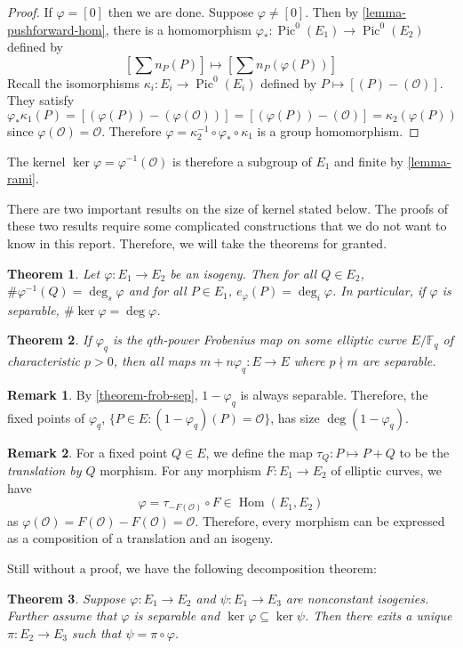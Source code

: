 \documentclass[12pt]{article}
\newtheorem{theorem}{Theorem}[subsection]
\theoremstyle{remark}
\theoremstyle{definition}
\newtheorem{remark}{Remark}[subsection]
\newcommand{\F}[0]{\mathbb{F}}
\newcommand{\ecO}[0]{\mathcal O}
\newcommand{\kp}[0]{\kappa}
\newcommand{\Hom}[0]{\operatorname{Hom}}
\newcommand{\Pic}[0]{\operatorname{Pic}}
\begin{document}
        \begin{proof}
            If $\varphi=[0]$ then we are done. Suppose $\varphi\neq[0]$. Then by \autoref{lemma-pushforward-hom}, there is a homomorphism $\varphi_*:\Pic^0(E_1)\to\Pic^0(E_2)$ defined by
            \[\left[\sum n_P(P)\right]\mapsto\left[\sum n_P(\varphi(P))\right]\]
            Recall the isomorphisms $\kp_i:E_i\to \Pic^0(E_i)$ defined by $P\mapsto [(P)-(\ecO)]$. They satisfy
            \[\varphi_*\kp_1(P)=[(\varphi(P))-(\varphi(\ecO))]=[(\varphi(P))-(\ecO)]=\kp_2(\varphi(P))\]
            since $\varphi(\ecO)=\ecO$. Therefore $\varphi=\kp_2^{-1}\circ\varphi_*\circ\kp_1$ is a group homomorphism.
        \end{proof}
        \noindent The kernel $\ker\varphi=\varphi^{-1}(\ecO)$ is therefore a subgroup of $E_1$ and finite by \autoref{lemma-rami}.
        
        There are two important results on the size of kernel stated below. The proofs of these two results require some complicated constructions that we do not want to know in this report. Therefore, we will take the theorems for granted.
        \begin{theorem}\label{theorem-size-ker-iso}
            Let $\varphi:E_1\to E_2$ be an isogeny. Then for all $Q\in E_2$, $\#\varphi^{-1}(Q)=\deg_s\varphi$ and for all $P\in E_1$, $e_\varphi(P)=\deg_i\varphi$. In particular, if $\varphi$ is separable, $\#\ker\varphi=\deg\varphi$.
        \end{theorem}
        \begin{theorem}\label{theorem-frob-sep}
            If $\varphi_q$ is the $q$th-power Frobenius map on some elliptic curve $E/\F_q$ of characteristic $p>0$, then all maps $m+n\varphi_q:E\to E$ where $p\nmid m$ are separable.
        \end{theorem}
        \begin{remark}
            By \autoref{theorem-frob-sep}, $1-\varphi_q$ is always separable. Therefore, the fixed points of $\varphi_q$, $\{P\in E:(1-\varphi_q)(P)=\ecO\}$, has size $\deg(1-\varphi_q)$.
        \end{remark}
        \begin{remark}\label{remark-translation}
            For a fixed point $Q\in E$, we define the map $\tau_Q:P\mapsto P+Q$ to be the \textit{translation by $Q$} morphism. For any morphism $F:E_1\to E_2$ of elliptic curves, we have
            \[\varphi=\tau_{-F(\ecO)}\circ F\in\Hom(E_1,E_2)\]
            as $\varphi(\ecO)=F(\ecO)-F(\ecO)=\ecO$. Therefore, every morphism can be expressed as a composition of a translation and an isogeny.
        \end{remark}
        Still without a proof, we have the following decomposition theorem:
        \begin{theorem}\label{theorem-isogeny-decomp}
            Suppose $\varphi:E_1\to E_2$ and $\psi:E_1\to E_3$ are nonconstant isogenies. Further assume that $\varphi$ is separable and $\ker\varphi\subseteq\ker\psi$. Then there exits a unique $\pi:E_2\to E_3$ such that $\psi=\pi\circ\varphi$.
        \end{theorem}
        
\end{document}
